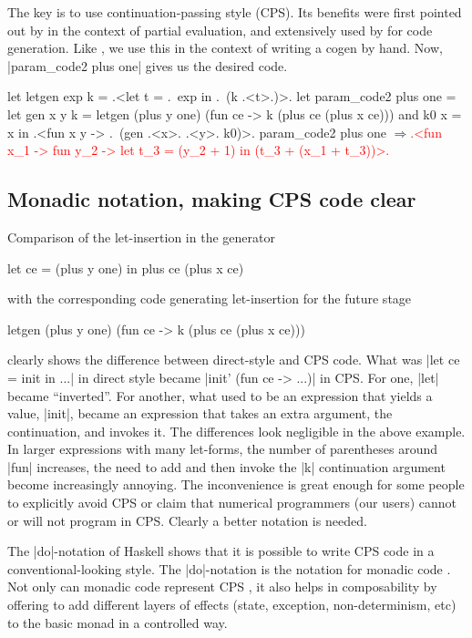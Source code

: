 \documentclass[draft]{elsart}
\newcommand{\evalresult}[1]{\ensuremath{\Longrightarrow}\textcolor{red}{#1}}
\begin{document}
The key is to use continuation-passing style (CPS). Its benefits were
first pointed out by \cite{Bondorf:92} in the context of partial
evaluation, and extensively used by \cite{MSP:PADL04,KiselyovTaha} for
code generation. Like \cite{conf/pepm/BondorfD94}, we use this in the 
context of writing a cogen by hand.  Now, |param_code2 plus one| gives us the
desired code.

\begin{code}
let letgen exp k = .<let t = .~exp in .~(k .<t>.)>.
let param_code2 plus one =
  let gen x y k = letgen (plus y one)
                         (fun ce -> k (plus ce (plus x ce)))
  and k0 x = x
  in .<fun x y -> .~(gen .<x>. .<y>. k0)>.
param_code2 plus one
\evalresult{.<fun x_1 -> fun y_2 -> let t_3 = (y_2 + 1) in (t_3 + (x_1 + t_3))>.}
\end{code}

\subsection{Monadic notation, making CPS code clear}\label{monadicnotation}

Comparison of the let-insertion in the generator
\begin{code}
let ce = (plus y one) in  plus ce (plus x ce)
\end{code}
with the corresponding code generating let-insertion for the future
stage
\begin{code}
letgen (plus y one) (fun ce -> k (plus ce (plus x ce)))
\end{code}
clearly shows the difference between  direct-style and CPS code.
What was |let ce = init in ...| in direct style became
|init' (fun ce -> ...)| in CPS. For one, |let| became
``inverted''. For another, what used to be an expression that yields
a value, |init|, became an expression that takes an extra argument,
the continuation, and invokes it. The differences look negligible in
the above example. In larger expressions with many let-forms, the
number of parentheses around |fun| increases, the need to add and
then invoke the |k| continuation argument become increasingly annoying. The
inconvenience is great enough for some people to explicitly avoid CPS
or claim that numerical programmers (our users) cannot or will not
program in CPS. Clearly a better notation is needed.

The |do|-notation of Haskell \cite{Haskell98Report} shows that it is possible
to write CPS code in a conventional-looking style. The
|do|-notation is the notation for monadic code \cite{moggi-notions}.
Not only can monadic code represent CPS \cite{Filinski:Representing},
it also helps in composability by offering to add different
layers of effects (state, exception, non-determinism, etc) to the
basic monad \cite{liang-interpreter} in a controlled way.
\end{document}
